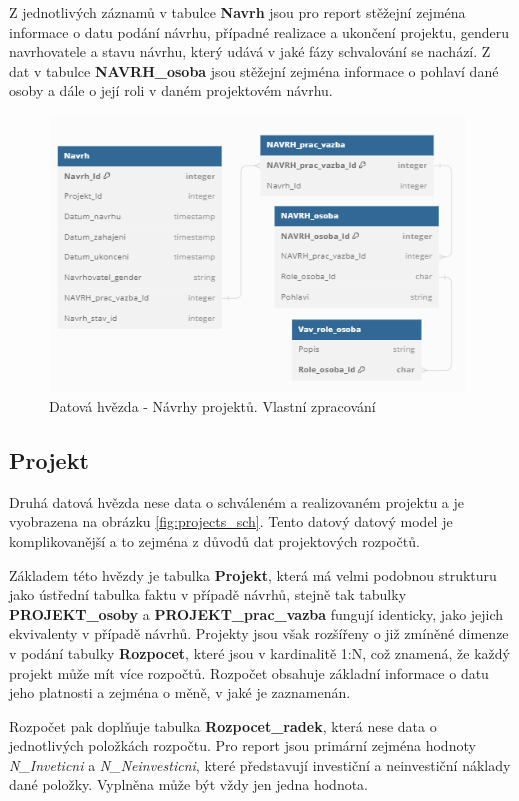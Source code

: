 \documentclass[
  digital,     %
  twoside,     %
  lof,         %
  lot,         %
]{fithesis4}
\begin{document}
Z jednotlivých záznamů v tabulce \textbf{Navrh} jsou pro report stěžejní zejména informace o datu podání návrhu, případné realizace a ukončení projektu, genderu navrhovatele a stavu návrhu, který udává v jaké fázy schvalování se nachází. Z dat v tabulce \textbf{NAVRH\_osoba} jsou stěžejní zejména informace o pohlaví dané osoby a dále o její roli v daném projektovém návrhu.
    \begin{figure}[t]
        \begin{center}
            \includegraphics[width=11cm]{img/draft_sch.png}
        \end{center}
        \caption{Datová hvězda - Návrhy projektů. Vlastní zpracování}
        \label{fig:draft_sch}
    \end{figure} 
    
\subsection{Projekt}
Druhá datová hvězda nese data o schváleném a realizovaném projektu a je vyobrazena na obrázku \ref{fig:projects_sch}. Tento datový datový model je komplikovanější a to zejména z důvodů dat projektových rozpočtů.

Základem této hvězdy je tabulka \textbf{Projekt}, která má velmi podobnou strukturu jako ústřední tabulka faktu v případě návrhů, stejně tak tabulky \textbf{PROJEKT\_osoby} a \textbf{PROJEKT\_prac\_vazba} fungují identicky, jako jejich ekvivalenty v případě návrhů. Projekty jsou však rozšířeny o již zmíněné dimenze v podání tabulky \textbf{Rozpocet}, které jsou v kardinalitě 1:N, což znamená, že každý projekt může mít více rozpočtů. Rozpočet obsahuje základní informace o datu jeho platnosti a zejména o měně, v jaké je zaznamenán.

Rozpočet pak doplňuje tabulka \textbf{Rozpocet\_radek}, která nese data o jednotlivých položkách rozpočtu. Pro report jsou primární zejména hodnoty \textit{N\_Inveticni} a \textit{N\_Neinvesticni}, které představují investiční a neinvestiční náklady dané položky. Vyplněna může být vždy jen jedna hodnota.
\end{document}
